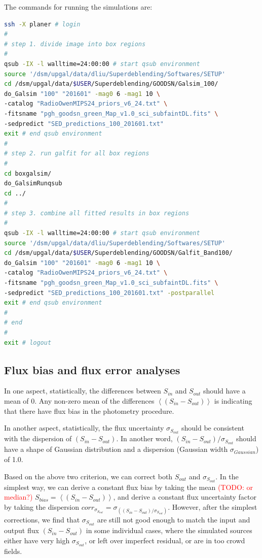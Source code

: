 \documentclass[11pt,a4paper]{article}
\begin{document}
The commands for running the simulations are:

\begin{lstlisting}[language=bash]
ssh -X planer # login
# 
# step 1. divide image into box regions
# 
qsub -IX -l walltime=24:00:00 # start qsub environment
source '/dsm/upgal/data/dliu/Superdeblending/Softwares/SETUP'
cd /dsm/upgal/data/$USER/Superdeblending/GOODSN/Galsim_100/
do_Galsim "100" "201601" -mag0 6 -mag1 10 \
-catalog "RadioOwenMIPS24_priors_v6_24.txt" \
-fitsname "pgh_goodsn_green_Map_v1.0_sci_subfaintDL.fits" \
-sedpredict "SED_predictions_100_201601.txt"
exit # end qsub environment
# 
# step 2. run galfit for all box regions
# 
cd boxgalsim/
do_GalsimRunqsub
cd ../
# 
# step 3. combine all fitted results in box regions
# 
qsub -IX -l walltime=24:00:00 # start qsub environment
source '/dsm/upgal/data/dliu/Superdeblending/Softwares/SETUP'
cd /dsm/upgal/data/$USER/Superdeblending/GOODSN/Galfit_Band100/
do_Galsim "100" "201601" -mag0 6 -mag1 10 \
-catalog "RadioOwenMIPS24_priors_v6_24.txt" \
-fitsname "pgh_goodsn_green_Map_v1.0_sci_subfaintDL.fits" \
-sedpredict "SED_predictions_100_201601.txt" -postparallel
exit # end qsub environment
# 
# end
# 
exit # logout
\end{lstlisting}


\subsection{Flux bias and flux error analyses}
\label{Band100_simanalyses}

In one aspect, statistically, the differences between $S_{in}$ and $S_{out}$ should have a mean of 0. Any non-zero mean of the differences $\left<(S_{in}-S_{out})\right>$ is indicating that there have flux bias in the photometry procedure. 

In another aspect, statistically, the flux uncertainty $\sigma_{S_{out}}$ should be consistent with the dispersion of $(S_{in}-S_{out})$. In another word, $(S_{in}-S_{out})/\sigma_{S_{out}}$ should have a shape of Gaussian distribution and a dispersion (Gaussian width $\sigma_{Gaussian}$) of 1.0. 

Based on the above two criterion, we can correct both $S_{out}$ and $\sigma_{S_{out}}$. In the simplest way, we can derive a constant flux bias by taking the mean \textcolor{red}{(TODO: or median?)} $S_{bias}=\left<(S_{in}-S_{out})\right>$, and derive a constant flux uncertainty factor by taking the dispersion ${corr}_{\sigma_{S_{out}}}=\sigma_{\left((S_{in}-S_{out})/\sigma_{S_{out}}\right)}$. However, after the simplest corrections, we find that $\sigma_{S_{out}}$ are still not good enough to match the input and output flux $(S_{in}-S_{out})$ in some individual cases, where the simulated sources either have very high $\sigma_{S_{out}}$, or left over imperfect residual, or are in too crowd fields. 
\end{document}
